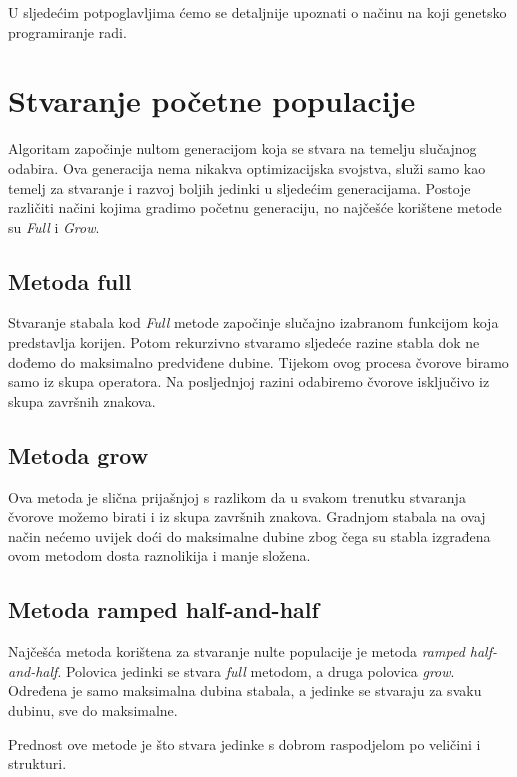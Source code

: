 \documentclass[times, utf8, zavrsni]{fer}
\begin{document}
U sljedećim potpoglavljima ćemo se detaljnije upoznati o načinu na koji genetsko programiranje radi.

\section{Stvaranje početne populacije}
Algoritam započinje nultom generacijom koja se stvara na temelju slučajnog odabira. Ova generacija nema nikakva optimizacijska svojstva, služi samo kao temelj za stvaranje i razvoj boljih jedinki u sljedećim generacijama. Postoje različiti načini kojima gradimo početnu generaciju, no najčešće korištene metode su \textit{Full} i \textit{Grow}.

\subsection{Metoda full}
Stvaranje stabala kod \textit{Full} metode započinje slučajno izabranom funkcijom koja predstavlja korijen. Potom rekurzivno stvaramo sljedeće razine stabla dok ne dođemo do maksimalno predviđene dubine. Tijekom ovog procesa čvorove biramo samo iz skupa operatora. Na posljednjoj razini odabiremo čvorove isključivo iz skupa završnih znakova.

\subsection{Metoda grow}
Ova metoda je slična prijašnjoj s razlikom da u svakom trenutku stvaranja čvorove možemo birati i iz skupa završnih znakova. Gradnjom stabala na ovaj način nećemo uvijek doći do maksimalne dubine zbog čega su stabla izgrađena ovom metodom dosta raznolikija i manje složena.

\subsection{Metoda ramped half-and-half}
Najčešća metoda korištena za stvaranje nulte populacije je metoda \textit{ramped half-and-half}. Polovica jedinki se stvara \textit{full} metodom, a druga polovica \textit{grow}. Određena je samo maksimalna dubina stabala, a jedinke se stvaraju za svaku dubinu, sve do maksimalne. 

Prednost ove metode je što stvara jedinke s dobrom raspodjelom po veličini i strukturi.
\end{document}
